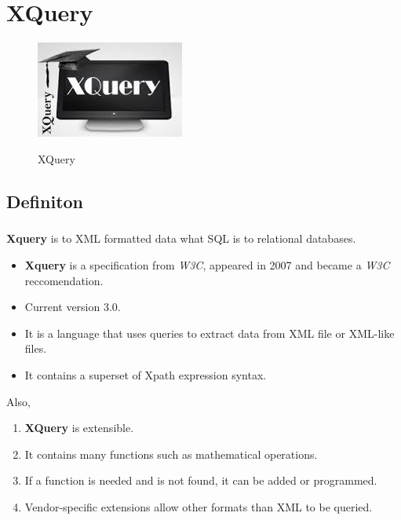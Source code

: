 \documentclass[a4paper,11pt]{report}
\begin{document}
\chapter{XQuery}

\begin{figure}[h]
	\centering
		\includegraphics{images/xquery_image.jpeg}~\\[1cm]
		\caption {XQuery}
\end{figure}

\section{Definiton}


\paragraph{}
\textbf{Xquery} is to XML formatted data what SQL is to relational databases. \cite{wikixquery}

\begin{itemize}
  \item \textbf{Xquery} is a specification from \textit{W3C}, appeared in 2007 and became a \textit{W3C} reccomendation. \cite{w3xquery}
  \item Current version 3.0.
  \item It is a language that uses queries to extract data from XML file or XML-like files.
  \item It contains a superset of Xpath expression syntax. \cite{xpath}
\end{itemize}
 
 Also, \\
 
 \begin{enumerate}
  \item \textbf{XQuery} is extensible.
  \item It contains many functions such as mathematical operations.
  \item If a function is needed and is not found, it can be added or programmed.
  \item Vendor-specific extensions allow other formats than XML to be queried.
\end{enumerate}
\end{document}

